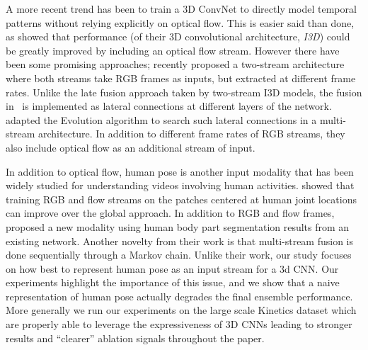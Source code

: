 \documentclass[letterpaper]{article} \usepackage{aaai21}  \usepackage{times}  \usepackage{helvet} \usepackage{courier}  \usepackage[hyphens]{url}  \usepackage{graphicx} \urlstyle{rm} \def\UrlFont{\rm}  \usepackage{natbib}  \usepackage{caption} \frenchspacing  \setlength{\pdfpagewidth}{8.5in}  \setlength{\pdfpageheight}{11in}
\begin{document}
A more recent trend has been to train a 3D ConvNet to directly model temporal patterns without relying explicitly on optical flow. This is easier said than done, as \citet{carreira2017quo} showed  that performance (of their 3D convolutional architecture, \emph{I3D}) could  be greatly improved by including an optical flow stream. However there have been some promising approaches; \citet{feichtenhofer2019slowfast} recently proposed a two-stream architecture where both streams take RGB frames as inputs, but extracted at different frame rates. Unlike the late fusion approach taken by two-stream I3D models, the fusion in~\citet{feichtenhofer2019slowfast} is implemented as lateral connections at different layers of the network. \citet{ryoo2019assemblenet} adapted the Evolution algorithm to search such lateral connections in a multi-stream architecture. In addition to different frame rates of RGB streams, they also include optical flow as an additional stream of input.

In addition to optical flow, human pose is another input modality that has been widely studied for understanding videos involving human activities. \citet{cheron2015p} showed that training RGB and flow streams on the patches centered at human joint locations can improve over the global approach. In addition to RGB and flow frames, \citet{zolfaghari2017chained} proposed a new modality using human body part segmentation results from an existing network. Another novelty from their work is that multi-stream fusion is done sequentially through a Markov chain. Unlike their work, our study focuses on how best to represent human pose as an input stream for a 3d CNN. Our experiments highlight the importance of this issue, and we show that a naive representation of human pose actually degrades the final ensemble performance. More generally we run our experiments on the large scale Kinetics dataset which are properly able to leverage the expressiveness of 3D CNNs leading to stronger results and ``clearer'' ablation signals throughout the paper.
\end{document}

